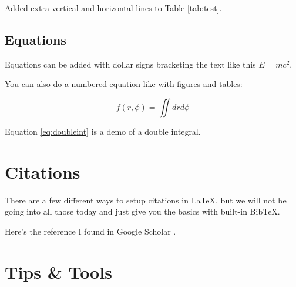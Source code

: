 \documentclass{article}  %
\begin{document}
Added extra vertical and horizontal lines to Table \ref{tab:test}. %

\subsection{Equations} %
Equations can be added with dollar signs bracketing the text like this $E = mc^2$.

You can also do a numbered equation like with figures and tables:

\begin{equation}
    f(r,\phi) = \iint dr d\phi
    \label{eq:doubleint}  %
\end{equation}

Equation \ref{eq:doubleint} is a demo of a double integral.


\section{Citations}
There are a few different ways to setup citations in \LaTeX, but we will not be going into all those today and just give you the basics with built-in BibTeX.


Here's the reference I found in Google Scholar \cite{haws2022space}.  %


\section{Tips \& Tools}
\end{document}
